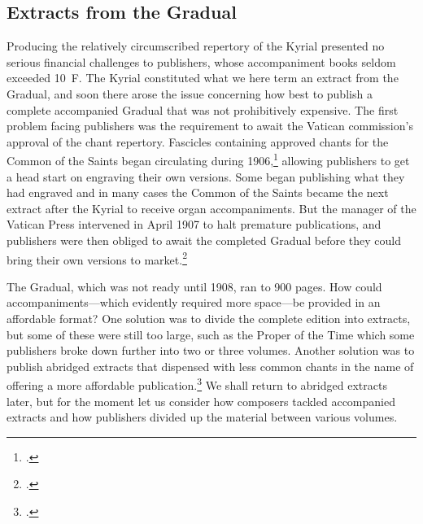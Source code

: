 \subsection{Extracts from the Gradual}
Producing the relatively circumscribed repertory of the Kyrial presented no serious financial challenges to publishers, whose accompaniment books seldom exceeded 10~F.
The Kyrial constituted what we here term an extract from the Gradual, and soon there arose the issue concerning how best to publish a complete accompanied Gradual that was not prohibitively expensive.
The first problem facing publishers was the requirement to await the Vatican commission's approval of the chant repertory.
Fascicles containing approved chants for the Common of the Saints began circulating during 1906,\footcite[6]{GrospellierCommunesanctorumedition1906} allowing publishers to get a head start on engraving their own versions.
Some began publishing what they had engraved and in many cases the Common of the Saints became the next extract after the Kyrial to receive organ accompaniments.
But the manager of the Vatican Press intervened in April 1907 to halt premature publications, and publishers were then obliged to await the completed Gradual before they could bring their own versions to market.\footcite[287--8]{HayburnPapalLegislationSacred1979}
\nowidow[2]

The Gradual, which was not ready until 1908, ran to 900 pages.
How could accompaniments---which evidently required more space---be provided in an affordable format?
One solution was to divide the complete edition into extracts, but some of these were still too large, such as the Proper of the Time which some publishers broke down further into two or three volumes.
Another solution was to publish abridged extracts that dispensed with less common chants in the name of offering a more affordable publication.\footcite[50--52]{WeinmannOrgelbegleitungGradualeRomanum1911}
We shall return to abridged extracts later, but for the moment let us consider how composers tackled accompanied extracts and how publishers divided up the material between various volumes.

